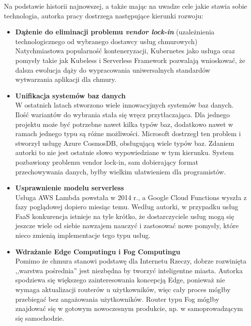 \documentclass[12pt,a4paper,twoside,titlepage,openright]{book}
\begin{document}
Na podstawie historii najnowszej, a także mając na uwadze cele jakie stawia sobie technologia, autorka pracy dostrzega następujące kierunki rozwoju:
\begin{itemize}
\item \textbf{Dążenie do eliminacji problemu \textit{vendor lock-in}} (uzależnienia technologicznego od wybranego dostawcy usług chmurowych) \\
Natychmiastowa popularność konteneryzacji, Kubernetes jako usługa oraz pomysły takie jak Kubeless i Serverless Framework pozwalają wnioskować, że dalsza ewolucja dąży do wypracowania uniwersalnych standardów wytwarzania aplikacji dla chmury.

\item \textbf{Unifikacja systemów baz danych} \\
W ostatnich latach stworzono wiele innowacyjnych systemów baz danych. Ilość wariantów do wybrania stała się wręcz przytłaczająca. Dla jednego projektu może być potrzebne nawet kilka typów baz, dodatkowo nawet w ramach jednego typu są różne możliwości. Microsoft dostrzegł ten problem i stworzył usługę Azure CosmosDB, obsługującą wiele typów baz. Zdaniem autorki to nie jest ostatnie słowo wypowiedziane w tym kierunku. System pozbawiony problemu vendor lock-in, sam dobierający format przechowywania danych, byłby wielkim ułatwieniem dla programistów.

\item \textbf{Usprawnienie modelu serverless} \\
Usługa AWS Lambda powstała w 2014 r., a Google Cloud Functions wyszła z fazy poglądowej dopiero miesiąc temu. Według autorki, w przypadku usług FaaS konkurencja istnieje na tyle krótko, że dostarczyciele usług mogą się jeszcze wiele od siebie nawzajem nauczyć i zastosować nowe pomysły, które nieco zmienią implementacje tego typu usług. 

\item \textbf{Wdrażanie Edge Computingu i Fog Computingu} \\
Pomimo że chmura stanowi podstawę dla Internetu Rzeczy, dobrze rozwinięta ,,warstwa pośrednia'' jest niezbędna by tworzyć inteligentne miasta. Autorka spodziewa się większego zainteresowania koncepcją Edge, ponieważ nie wymaga aktualizacji routerów u użytkowników, więc cały proces mógłby przebiegać bez angażowania użytkowników. Router typu Fog mógłby znajdować się w gotowym nowoczesnym produkcie, np. w samoprowadzącym się samochodzie. 


\end{itemize}
\end{document}
